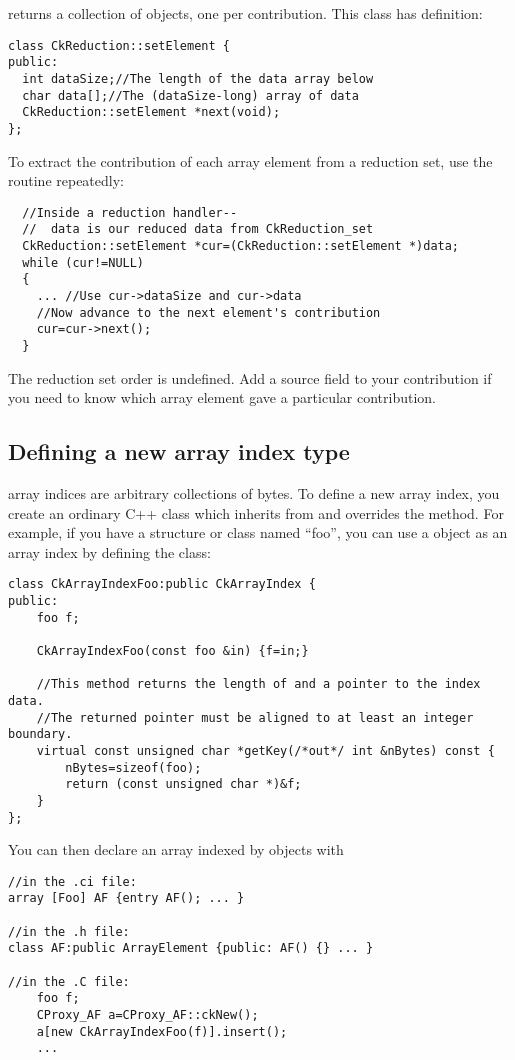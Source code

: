  returns a collection of  objects, one per contribution.  This class has definition:
\begin{verbatim}
class CkReduction::setElement {
public:
  int dataSize;//The length of the data array below
  char data[];//The (dataSize-long) array of data
  CkReduction::setElement *next(void);
};
\end{verbatim}

To extract the contribution of each array element from a reduction set, use the  routine repeatedly:
\begin{verbatim}
  //Inside a reduction handler-- 
  //  data is our reduced data from CkReduction_set
  CkReduction::setElement *cur=(CkReduction::setElement *)data;
  while (cur!=NULL)
  {
    ... //Use cur->dataSize and cur->data
    //Now advance to the next element's contribution
    cur=cur->next();
  }
\end{verbatim}

The reduction set order is undefined.  Add a source field to your contribution if you need to know which array element gave a particular contribution.

\subsection{Defining a new array index type}
\charmpp array indices are arbitrary collections of bytes.
To define a new array index, you create an ordinary C++ class 
which inherits from  and overrides the  method.  
For example, if you have a structure or class named ``foo'', you 
can use a  object as an array index by defining the class:

\begin{verbatim}
class CkArrayIndexFoo:public CkArrayIndex {
public:
    foo f;

    CkArrayIndexFoo(const foo &in) {f=in;}

    //This method returns the length of and a pointer to the index data.
    //The returned pointer must be aligned to at least an integer boundary.
    virtual const unsigned char *getKey(/*out*/ int &nBytes) const {
      	nBytes=sizeof(foo);
        return (const unsigned char *)&f;
    }
};
\end{verbatim}

You can then declare an array indexed by  objects with

\begin{verbatim}
//in the .ci file:
array [Foo] AF {entry AF(); ... }

//in the .h file:
class AF:public ArrayElement {public: AF() {} ... }

//in the .C file:
    foo f;
    CProxy_AF a=CProxy_AF::ckNew();
    a[new CkArrayIndexFoo(f)].insert();
    ...
\end{verbatim}

